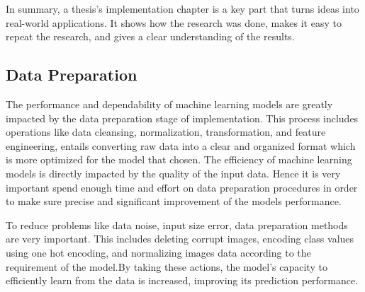 \documentclass[12pt,onecolumn]{report}
\begin{document}
In summary, a thesis’s implementation chapter is a key part that turns ideas into real-world applications. It shows how the research was done, makes it easy to repeat the research, and gives a clear understanding of the results.

\subsection{Data Preparation}
The performance and dependability of machine learning models are greatly impacted by the data preparation stage of implementation. This process includes operations like data cleansing, normalization, transformation, and feature engineering, entails converting raw data into a clear and organized format which is more optimized for the model that chosen. The efficiency of machine learning models is directly impacted by the quality of the input data. Hence it is very important spend enough time and effort on data preparation procedures in order to make sure precise and significant improvement of the models performance. 

To reduce problems like data noise, input size error, data preparation methods are very important. This includes deleting corrupt images, encoding class values using one hot encoding, and normalizing images data according to the requirement of the model.By taking these actions, the model's capacity to efficiently learn from the data is increased, improving its prediction performance. 
\end{document}
